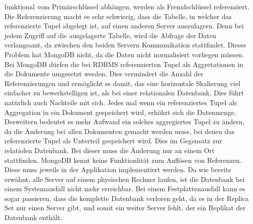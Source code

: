  funktional vom Primärschlüssel abhängen, werden als Fremdschlüssel
 referenziert. Die Referenzierung macht es sehr schwierig, dass die Tabelle, in
 welcher das referenzierte Tupel abgelegt ist, auf einen anderen Server
 auszulagern. Denn bei jedem Zugriff auf die ausgelagerte Tabelle, wird die
 Abfrage der Daten verlangsamt, da zwischen den beiden Servern Kommunikation
 stattfindet. Dieses Problem hat MongoDB nicht, da die Daten nicht normalisiert
 vorliegen müssen. Bei MongoDB dürfen die bei RDBMS referenzierten Tupel als
 Aggretationen in die Dokumente umgesetzt werden. Dies vermindert die Anzahl der
 Referenzierungen und ermöglicht es damit, das eine horizontale Skalierung viel
 einfacher zu bewerkstelligen ist, als bei einer relationalen Datenbank. Dies
 führt natürlich auch Nachteile mit sich. Jedes mal wenn ein referenziertes
 Tupel als Aggregation in ein Dokument gespeichert wird, erhöhrt sich die
 Datenmenge. Desweitern bedeutet es mehr Aufwand ein solches aggregiertes Tupel 
 zu ändern, da die Änderung bei allen Dokumenten gemacht werden muss, bei denen
 das referenzierte Tupel als Unterteil gespeichert wird. Dies im Gegensatz zur
 relatiolen Datenbank. Bei dieser muss die Änderung nur an einem Ort
 stattfinden. MongoDB kennt keine Funktionlität zum Auflösen von Referenzen.
 Diese muss jeweils in der Applikation implementiert werden. 
 Da wie bereits erwähnt, alle Server auf einem physischen Rechner
 laufen, ist die Datenbank bei einem Systemausfall nicht mehr erreichbar.
Bei einem Festplattenausfall kann es sogar passieren, dass die komplette
Datenbank verloren geht, da es in der Replica Set nur einen Server gibt, und
somit ein weiter Server fehlt, der ein Replikat der Datenbank enthält.
 